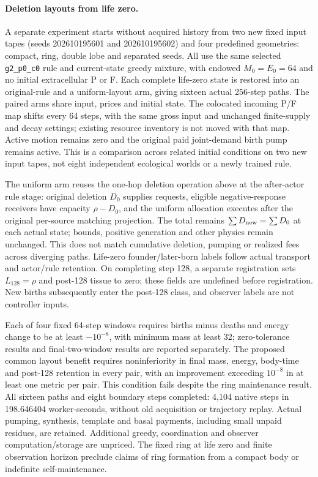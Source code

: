 \paragraph{Deletion layouts from life zero.}
A separate experiment starts without acquired history from two new fixed input tapes (seeds 202610195601 and 202610195602) and four predefined geometries: compact, ring, double lobe and separated seeds. All use the same selected \texttt{g2\_p0\_c0} rule and current-state greedy mixture, with endowed $M_0=E_0=64$ and no initial extracellular P or F. Each complete life-zero state is restored into an original-rule and a uniform-layout arm, giving sixteen actual 256-step paths. The paired arms share input, prices and initial state. The colocated incoming P/F map shifts every 64 steps, with the same gross input and unchanged finite-supply and decay settings; existing resource inventory is not moved with that map. Active motion remains zero and the original paid joint-demand birth pump remains active. This is a comparison across related initial conditions on two new input tapes, not eight independent ecological worlds or a newly trained rule.

The uniform arm reuses the one-hop deletion operation above at the after-actor rule stage: original deletion $D_0$ supplies requests, eligible negative-response receivers have capacity $\rho-D_0$, and the uniform allocation executes after the original per-source matching projection. The total remains $\sum D_{\rm new}=\sum D_0$ at each actual state; bounds, positive generation and other physics remain unchanged. This does not match cumulative deletion, pumping or realized fees across diverging paths. Life-zero founder/later-born labels follow actual transport and actor/rule retention. On completing step 128, a separate registration sets $L_{128}=\rho$ and post-128 tissue to zero; these fields are undefined before registration. New births subsequently enter the post-128 class, and observer labels are not controller inputs.

Each of four fixed 64-step windows requires births minus deaths and energy change to be at least $-10^{-8}$, with minimum mass at least 32; zero-tolerance results and final-two-window results are reported separately. The proposed common layout benefit requires noninferiority in final mass, energy, body-time and post-128 retention in every pair, with an improvement exceeding $10^{-8}$ in at least one metric per pair. This condition fails despite the ring maintenance result. All sixteen paths and eight boundary steps completed: 4,104 native steps in 198.646404 worker-seconds, without old acquisition or trajectory replay. Actual pumping, synthesis, template and basal payments, including small unpaid residues, are retained. Additional greedy, coordination and observer computation/storage are unpriced. The fixed ring at life zero and finite observation horizon preclude claims of ring formation from a compact body or indefinite self-maintenance.

